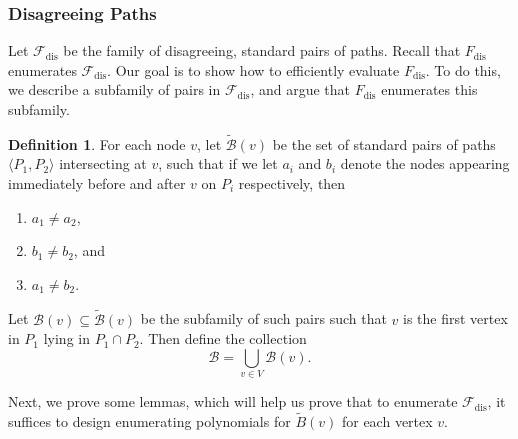 \documentclass[11pt]{article}
\newcommand{\ca}{\mathcal}
\newcommand{\Frev}{F_{\text{dis}}}
\newcommand{\Fdis}{\mathcal{F}_{\text{dis}}}
\newcommand{\Bdis}{\mathcal{B}_{\text{dis}}}
\theoremstyle{definition}
\newtheorem{definition}[theorem]{Definition}
\begin{document}
\subsubsection*{Disagreeing Paths}

Let $\Fdis$ be the family of disagreeing, standard pairs of paths.
Recall that $\Frev$ enumerates $\Fdis$.
Our goal is to show how to efficiently evaluate $\Frev$.
To do this, we describe a subfamily of pairs in $\Fdis$, and argue that $\Frev$ enumerates this subfamily.


\begin{definition}
\label{def:local-relaxation}
For each node $v$, let $\tilde{\ca{B}}(v)$ be the set of standard pairs of paths $\langle P_1,P_2\rangle$ intersecting at $v$, such that 
    if we let $a_i$ and $b_i$ denote the nodes appearing immediately before and after $v$ on $P_i$ respectively, then
    \begin{enumerate}
    \item $a_1\neq a_2$, 
    \item $b_1\neq b_2$, and 
    \item $a_1\neq b_2$.
\end{enumerate}
Let $\ca{B}(v)\subseteq\tilde{\ca{B}}(v)$ be the subfamily of such pairs such that $v$ is the first vertex in $P_1$ lying in $P_1\cap P_2$.
Then define the collection
    \[\ca{B} = \bigcup_{v\in V} \ca{B}(v).\]
\end{definition}

Next, we prove some lemmas, which will help us prove that to enumerate $\Fdis$, it suffices to design enumerating polynomials for $\tilde{B}(v)$ for each vertex $v$. 
\end{document}
